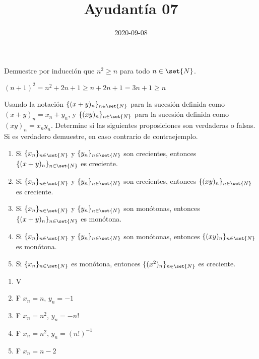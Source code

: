 \documentclass{ayudantia}
\title{Ayudantía 07}
\date{2020-09-08}
\begin{document}
\maketitle

\begin{prob}
    Demuestre por inducción que \(n^2\geq n\) para todo \(n\in\set{N}\).
\end{prob}

\begin{ans}
    \begin{sol}
        \((n+1)^2=n^2+2n+1\geq n+2n+1=3n+1\geq n\)
    \end{sol}
\end{ans}


\begin{prob}
    Usando la notación \(\{(x+y)_n\}_{n\in\set{N}}\) para la sucesión definida como \((x+y)_n=x_n+y_n\), y \(\{(xy)_n\}_{n\in\set{N}}\) para la sucesión definida como \((xy)_n=x_ny_n\). Determine si las siguientes proposiciones son verdaderas o falsas. Si es verdadero demuestre, en caso contrario de contraejemplo.
    \begin{enumerate}
        \item Si \(\{x_n\}_{n\in\set{N}}\) y \(\{y_n\}_{n\in\set{N}}\) son crecientes, entonces \(\{(x+y)_n\}_{n\in\set{N}}\) es creciente.
        \item Si \(\{x_n\}_{n\in\set{N}}\) y \(\{y_n\}_{n\in\set{N}}\) son crecientes, entonces \(\{(xy)_n\}_{n\in\set{N}}\) es creciente.
        \item Si \(\{x_n\}_{n\in\set{N}}\) y \(\{y_n\}_{n\in\set{N}}\) son monótonas, entonces \(\{(x+y)_n\}_{n\in\set{N}}\) es monótona.
        \item Si \(\{x_n\}_{n\in\set{N}}\) y \(\{y_n\}_{n\in\set{N}}\) son monótonas, entonces \(\{(xy)_n\}_{n\in\set{N}}\) es monótona.
        \item Si \(\{x_n\}_{n\in\set{N}}\) es monótona, entonces \(\{(x^2)_n\}_{n\in\set{N}}\) es creciente.
    \end{enumerate}
\end{prob}

\begin{ans}
    \begin{sol}
        \begin{enumerate}
            \item V
            \item F \(x_n=n\), \(y_n=-1\)
            \item F \(x_n=n^2\), \(y_n=-n!\)
            \item F \(x_n=n^2\), \(y_n=(n!)^{-1}\)
            \item F \(x_n=n-2\)
        \end{enumerate}
    \end{sol}
\end{ans}
\end{document}
